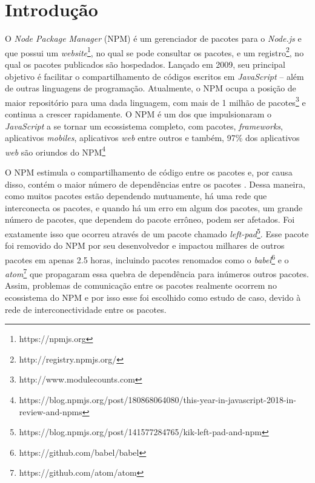 \chapter{Introdução}
\label{cap:introducao}

O \textit{Node Package Manager} (NPM) é um gerenciador de pacotes para o \textit{Node.js} e que possui um \textit{website}\footnote{https://npmjs.org}, no qual se pode consultar os pacotes, e um registro\footnote{http://registry.npmjs.org/}, no qual os pacotes publicados são hospedados. Lançado em 2009, seu principal objetivo é facilitar o compartilhamento de códigos escritos em \textit{JavaScript} -- além de outras linguagens de programação. Atualmente, o NPM ocupa a posição de maior repositório para uma dada linguagem, com mais de 1 milhão de pacotes\footnote{http://www.modulecounts.com} e continua a crescer rapidamente. O NPM é um dos que impulsionaram o \textit{JavaScript} a se tornar um ecossistema completo, com pacotes, \textit{frameworks}, aplicativos \textit{mobiles}, aplicativos \textit{web} entre outros \cite{introduction:npm} e também,  97\% dos aplicativos \textit{web} são oriundos do NPM\footnote{https://blog.npmjs.org/post/180868064080/this-year-in-javascript-2018-in-review-and-npms}

O NPM estimula o compartilhamento de código entre os pacotes e, por causa disso, contém o maior número de dependências entre os pacotes \cite{teorical_reference:npm_2}. Dessa maneira, como muitos pacotes estão dependendo mutuamente, há uma rede que interconecta os pacotes, e quando há um erro em algum dos pacotes, um grande número de pacotes, que dependem do pacote errôneo, podem ser afetados. Foi exatamente isso que ocorreu através de um pacote chamado \textit{left-pad}\footnote{https://blog.npmjs.org/post/141577284765/kik-left-pad-and-npm}. Esse pacote foi removido do NPM por seu desenvolvedor e impactou milhares de outros pacotes em apenas 2.5 horas, incluindo pacotes renomados como o \textit{babel}\footnote{https://github.com/babel/babel} e o \textit{atom}\footnote{https://github.com/atom/atom} que propagaram essa quebra de dependência para inúmeros outros pacotes. Assim, problemas de comunicação entre os pacotes realmente ocorrem no ecossistema do NPM e por isso esse foi escolhido como estudo de caso, devido à rede de interconectividade entre os pacotes.

